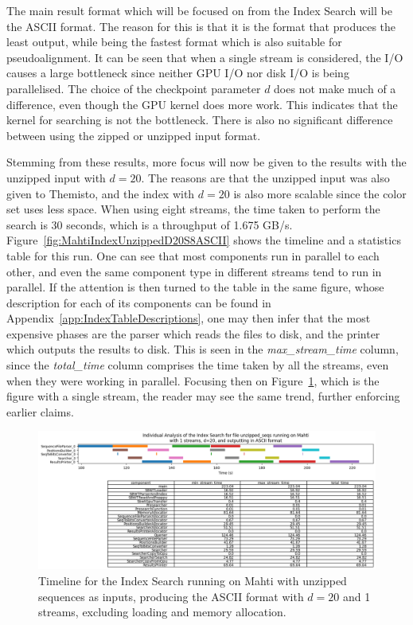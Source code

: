 The main result format which will be focused on from the Index Search will be the ASCII format.
The reason for this is that it is the format that produces the least output, while being the fastest format which is also suitable for pseudoalignment.
It can be seen that when a single stream is considered, the I/O causes a large bottleneck since neither GPU I/O nor disk I/O is being parallelised.
The choice of the checkpoint parameter $d$ does not make much of a difference, even though the GPU kernel does more work.
This indicates that the kernel for searching is not the bottleneck.
There is also no significant difference between using the zipped or unzipped input format.

Stemming from these results, more focus will now be given to the results with the unzipped input with $d=20$.
The reasons are that the unzipped input was also given to Themisto, and the index with $d=20$ is also more scalable since the color set uses less space.
When using eight streams, the time taken to perform the search is 30 seconds, which is a throughput of 1.675 GB/s.
Figure~\ref{fig:MahtiIndexUnzippedD20S8ASCII} shows the timeline and a statistics table for this run.
One can see that most components run in parallel to each other, and even the same component type in different streams tend to run in parallel.
If the attention is then turned to the table in the same figure, whose description for each of its components can be found in Appendix~\ref{app:IndexTableDescriptions}, one may then infer that the most expensive phases are the parser which reads the files to disk, and the printer which outputs the results to disk.
This is seen in the \textit{max\_stream\_time} column, since the \textit{total\_time} column comprises the time taken by all the streams, even when they were working in parallel.
Focusing then on Figure~\ref{fig:MahtiIndexUnzippedD20S1ASCII}, which is the figure with a single stream, the reader may see the same trend, further enforcing earlier claims.

\begin{figure}[t]
  \centering
  \includegraphics[width=\textwidth]{images/MahtiIndexUnzippedD20S1ASCII.png}
  \caption{Timeline for the Index Search running on Mahti with unzipped sequences as inputs, producing the ASCII format with $d=20$ and 1 streams, excluding loading and memory allocation.}\label{fig:MahtiIndexUnzippedD20S1ASCII}
\end{figure}


